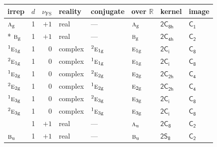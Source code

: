 \documentclass[10pt,a4paper]{article}
\numberwithin{equation}{section}
\newcommand{\grp}[1]{\mathsf{#1}}
\newcommand{\irr}[1]{\text{\normalfont\scshape #1}}
\newcommand{\conjpair}[1]{{}^{#1}}
\newcommand{\detbox}[1]{{\setlength{\fboxsep}{1pt}\fbox{#1}}}
\newcommand{\ptag}[1]{\mathrm{#1}}
\newcommand{\fsind}{\nu_{\mathrm{FS}}}
\begin{document}
{\small\renewcommand{\arraystretch}{1.25}\setlength{\tabcolsep}{4pt}\begin{longtable}{@{}lrrlllll@{}}\toprule
irrep & $d$ & $\fsind$ & reality & conjugate & over $\mathbb{R}$ & kernel & image\\\midrule\endhead
\bottomrule\endfoot\endlastfoot
$\irr{a}_{\ptag{g}}$ & 1 & $+1$ & real & --- & $\irr{a}_{\ptag{g}}$ & \href{2C8h.pdf}{$\grp{2C_{8h}}$} & \href{../../../rotation/data/pdf/C1.pdf}{$\grp{C_{1}}$}\\*
$\irr{b}_{\ptag{g}}$ & 1 & $+1$ & real & --- & $\irr{b}_{\ptag{g}}$ & \href{2C4h.pdf}{$\grp{2C_{4h}}$} & \href{../../../rotation/data/pdf/C2.pdf}{$\grp{C_{2}}$}\\
$\conjpair{1}\irr{e}_{1\ptag{g}}$ & 1 & $0$ & complex & $\conjpair{2}\irr{e}_{1\ptag{g}}$ & $\irr{e}_{1\ptag{g}}$ & \href{2S2.pdf}{$\grp{2C_{i}}$} & \href{../../../rotation/data/pdf/C8.pdf}{$\grp{C_{8}}$}\\
$\conjpair{2}\irr{e}_{1\ptag{g}}$ & 1 & $0$ & complex & $\conjpair{1}\irr{e}_{1\ptag{g}}$ & $\irr{e}_{1\ptag{g}}$ & \href{2S2.pdf}{$\grp{2C_{i}}$} & \href{../../../rotation/data/pdf/C8.pdf}{$\grp{C_{8}}$}\\
$\conjpair{1}\irr{e}_{2\ptag{g}}$ & 1 & $0$ & complex & $\conjpair{2}\irr{e}_{2\ptag{g}}$ & $\irr{e}_{2\ptag{g}}$ & \href{2C2h.pdf}{$\grp{2C_{2h}}$} & \href{../../../rotation/data/pdf/C4.pdf}{$\grp{C_{4}}$}\\
$\conjpair{2}\irr{e}_{2\ptag{g}}$ & 1 & $0$ & complex & $\conjpair{1}\irr{e}_{2\ptag{g}}$ & $\irr{e}_{2\ptag{g}}$ & \href{2C2h.pdf}{$\grp{2C_{2h}}$} & \href{../../../rotation/data/pdf/C4.pdf}{$\grp{C_{4}}$}\\
$\conjpair{1}\irr{e}_{3\ptag{g}}$ & 1 & $0$ & complex & $\conjpair{2}\irr{e}_{3\ptag{g}}$ & $\irr{e}_{3\ptag{g}}$ & \href{2S2.pdf}{$\grp{2C_{i}}$} & \href{../../../rotation/data/pdf/C8.pdf}{$\grp{C_{8}}$}\\
$\conjpair{2}\irr{e}_{3\ptag{g}}$ & 1 & $0$ & complex & $\conjpair{1}\irr{e}_{3\ptag{g}}$ & $\irr{e}_{3\ptag{g}}$ & \href{2S2.pdf}{$\grp{2C_{i}}$} & \href{../../../rotation/data/pdf/C8.pdf}{$\grp{C_{8}}$}\\
\detbox{$\irr{a}_{\ptag{u}}$} & 1 & $+1$ & real & --- & $\irr{a}_{\ptag{u}}$ & \href{2C8.pdf}{$\grp{2C_{8}}$} & \href{../../../rotation/data/pdf/C2.pdf}{$\grp{C_{2}}$}\\
$\irr{b}_{\ptag{u}}$ & 1 & $+1$ & real & --- & $\irr{b}_{\ptag{u}}$ & \href{2S8.pdf}{$\grp{2S_{8}}$} & \href{../../../rotation/data/pdf/C2.pdf}{$\grp{C_{2}}$}\\

\end{longtable}}
\end{document}
